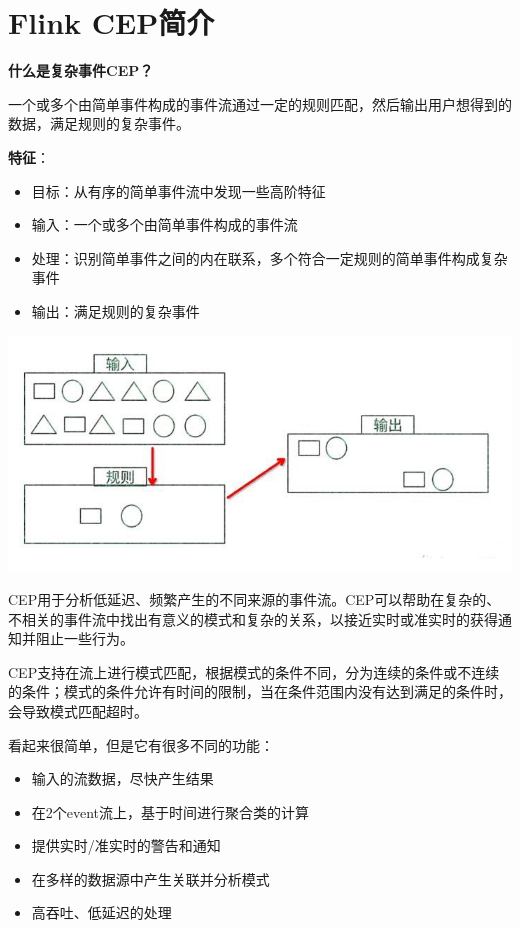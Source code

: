 \documentclass[oneside]{ctexbook}
\begin{document}
\chapter{Flink CEP简介}

\textbf{什么是复杂事件CEP？}

一个或多个由简单事件构成的事件流通过一定的规则匹配，然后输出用户想得到的数据，满足规则的复杂事件。

\textbf{特征}：

\begin{itemize}
\item 目标：从有序的简单事件流中发现一些高阶特征
\item 输入：一个或多个由简单事件构成的事件流
\item 处理：识别简单事件之间的内在联系，多个符合一定规则的简单事件构成复杂事件
\item 输出：满足规则的复杂事件
\end{itemize}

\noindent \includegraphics[width=\textwidth]{cep1.jpg}

CEP用于分析低延迟、频繁产生的不同来源的事件流。CEP可以帮助在复杂的、不相关的事件流中找出有意义的模式和复杂的关系，以接近实时或准实时的获得通知并阻止一些行为。

CEP支持在流上进行模式匹配，根据模式的条件不同，分为连续的条件或不连续的条件；模式的条件允许有时间的限制，当在条件范围内没有达到满足的条件时，会导致模式匹配超时。

看起来很简单，但是它有很多不同的功能：

\begin{itemize}
\item 输入的流数据，尽快产生结果
\item 在2个event流上，基于时间进行聚合类的计算
\item 提供实时/准实时的警告和通知
\item 在多样的数据源中产生关联并分析模式
\item 高吞吐、低延迟的处理
\end{itemize}
\end{document}
